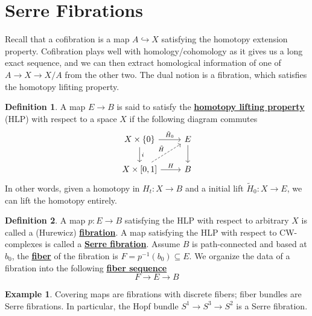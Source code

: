 \documentclass{article}
\theoremstyle{definition}
\theoremstyle{definition}
\theoremstyle{definition}
\theoremstyle{definition}
\theoremstyle{definition}
\newtheorem{definition}{Definition}[section]
\theoremstyle{definition}
\theoremstyle{definition}
\newtheorem{example}{Example}[section]
\begin{document}
\section{Serre Fibrations}
Recall that a cofibration is a map $A\hookrightarrow X$ satisfying the homotopy extension property. Cofibration plays well with homology/cohomology as it gives us a long exact sequence, and we can then extract homological information of one of $A\to X\to X/A$ from the other two. The dual notion is a fibration, which satisfies the homotopy lifiting property.

\begin{tcolorbox}[colback=purple!5!white,colframe=purple!75!black]
\begin{definition}
A map $E\to B$ is said to satisfy the \underline{\textbf{homotopy lifting property}} (HLP) with respect to a space $X$ if the following diagram commutes
\[
\begin{tikzcd}
X\times \{0\}\arrow[r,"\tilde{H}_0"]\arrow[d,"i"]&E\arrow[d]\\
X\times [0,1]\arrow[r,"H"]\arrow[ur,dashed,"\tilde{H}"]&B
\end{tikzcd}    
\]
In other words, given a homotopy in $H_t: X\to B$ and a initial lift $\tilde{H}_0: X\to E$, we can lift the homotopy entirely.
\end{definition}
\end{tcolorbox}

\begin{tcolorbox}[colback=purple!5!white,colframe=purple!75!black]
\begin{definition}
A map $p:E\to B$ satisfying the HLP with respect to arbitrary $X$ is called a (Hurewicz)  \underline{\textbf{fibration}}. A map satisfying the HLP with respect to CW-complexes is called a \underline{\textbf{Serre fibration}}. Assume $B$ is path-connected and based at $b_0$, the \underline{\textbf{fiber}} of the fibration is $F=p^{-1}(b_0)\subseteq E$. We organize the data of a fibration into the following \underline{\textbf{fiber sequence}}
\[F\to E\to B\]
\end{definition}
\end{tcolorbox}

\begin{tcolorbox}[colback=yellow!5!white,colframe=yellow!30!white]
\begin{example}
	Covering maps are fibrations with discrete fibers; fiber bundles are Serre fibrations. In particular, the Hopf bundle $S^1\to S^3\to S^2$ is a Serre fibration. 
\end{example}
\end{tcolorbox}
\end{document}

